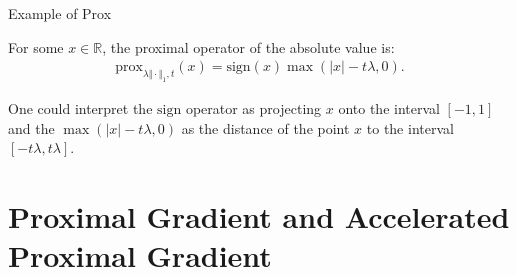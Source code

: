 \documentclass[11pt]{beamer}
\begin{document}
        \begin{frame}{Example of Prox}
            \begin{definition}
                For some $x \in \mathbb R$, the proximal operator of the absolute value is:
                \begin{align*}
                   \text{prox}_{\lambda \Vert\cdot \Vert_1, t}(x) = \text{sign}(x)\max(|x| - t\lambda , 0). 
                \end{align*}
            \end{definition}
            One could interpret the $\text{sign}$ operator as projecting $x$ onto the interval $[-1, 1]$ and the $\max(|x| - t\lambda , 0)$ as the distance of the point $x$ to the interval $[-t\lambda, t\lambda]$. 
        \end{frame}
        

\section{Proximal Gradient and Accelerated Proximal Gradient}
\end{document}
